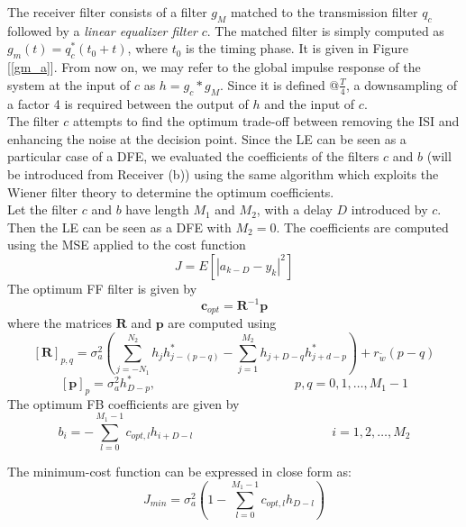 \documentclass[a4paper, 12pt]{report}
\begin{document}
The receiver filter consists of a filter $g_M$ matched to the transmission filter $q_c$ followed by a \textit{linear equalizer filter} $c$. The matched filter is simply computed as $g_m(t) = q^*_c(t_0+t)$, where $t_0$ is the timing phase. It is given in Figure [\ref{gm_a}]. From now on, we may refer to the global impulse response of the system at the input of  $c$ as $h = g_c * g_M$. Since it is defined @$\frac{T}{4}$, a downsampling of a factor 4 is required between the output of $h$ and the input of $c$. \\
The filter $c$ attempts to find the optimum trade-off between removing the ISI and enhancing the noise at the decision point. Since the LE can be seen as a particular case of a DFE, we evaluated the coefficients of the filters $c$ and $b$ (will be introduced from Receiver (b)) using the same algorithm which exploits the Wiener filter theory to determine the optimum coefficients. \\
Let the filter $c$ and $b$ have length $M_1$ and $M_2$, with a delay $D$ introduced by $c$. Then the LE can be seen as a DFE with $M_2=0$. The coefficients are computed using the MSE applied to the cost function
\begin{equation}
J = E \left[|a_{k-D}-y_k|^2\right]
\end{equation}
The optimum FF filter is given by
\begin{equation}\label{c}
\mathbf{c}_{opt} = \mathbf{R}^{-1}\mathbf{p}
\end{equation}
where the matrices $\mathbf{R}$ and $\mathbf{p}$ are computed using
\begin{equation}
\mathbf{[R]}_{p,q} = \sigma_a^2 \left( \sum_{j=-N_1}^{N_2}h_jh^*_{j-(p-q)}-\sum_{j=1}^{M_2}h_{j+D-q}h^*_{j+d-p} \right) + r_{\tilde{w}}(p-q)
\end{equation}
\begin{equation}
\mathbf{[p]}_p = \sigma_a^2 h^*_{D-p}, \quad\quad\quad\quad\quad\quad\quad\quad\quad\quad\quad p,q = 0,1,\dots,M_1-1
\end{equation}
The optimum FB coefficients are given by
\begin{equation}
b_i = -\sum_{l=0}^{M_1-1}c_{opt,l}h_{i+D-l} \quad\quad\quad\quad\quad\quad\quad\quad\quad\quad\quad i =1,2,\dots,M_2
\end{equation}

The minimum-cost function can be expressed in close form as:
\begin{equation}
J_{min} = \sigma^2_a \left( 1-\sum_{l=0}^{M_1-1} c_{opt,l}h_{D-l}\right)
\end{equation}
\end{document}
